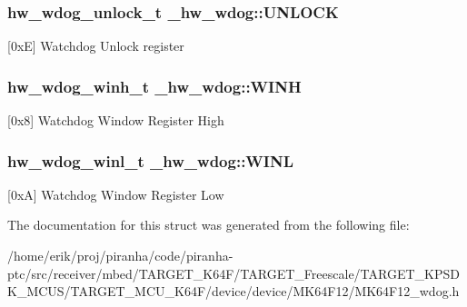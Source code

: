 \subsubsection[{\texorpdfstring{U\+N\+L\+O\+CK}{UNLOCK}}]{ {\bf hw\+\_\+wdog\+\_\+unlock\+\_\+t} \+\_\+hw\+\_\+wdog\+::\+U\+N\+L\+O\+CK}\hypertarget{struct__hw__wdog_a0a7523239c13256dca0cefa10aaf1ddf}{}\label{struct__hw__wdog_a0a7523239c13256dca0cefa10aaf1ddf}
\mbox{[}0xE\mbox{]} Watchdog Unlock register 
\subsubsection[{\texorpdfstring{W\+I\+NH}{WINH}}]{ {\bf hw\+\_\+wdog\+\_\+winh\+\_\+t} \+\_\+hw\+\_\+wdog\+::\+W\+I\+NH}\hypertarget{struct__hw__wdog_a2defae9e7cca4f46032b7bec7fa9f607}{}\label{struct__hw__wdog_a2defae9e7cca4f46032b7bec7fa9f607}
\mbox{[}0x8\mbox{]} Watchdog Window Register High 
\subsubsection[{\texorpdfstring{W\+I\+NL}{WINL}}]{ {\bf hw\+\_\+wdog\+\_\+winl\+\_\+t} \+\_\+hw\+\_\+wdog\+::\+W\+I\+NL}\hypertarget{struct__hw__wdog_ac5090ab8729dae9d452a8606b550b86b}{}\label{struct__hw__wdog_ac5090ab8729dae9d452a8606b550b86b}
\mbox{[}0xA\mbox{]} Watchdog Window Register Low 

The documentation for this struct was generated from the following file\+:\begin{DoxyCompactItemize}
\item 
/home/erik/proj/piranha/code/piranha-\/ptc/src/receiver/mbed/\+T\+A\+R\+G\+E\+T\+\_\+\+K64\+F/\+T\+A\+R\+G\+E\+T\+\_\+\+Freescale/\+T\+A\+R\+G\+E\+T\+\_\+\+K\+P\+S\+D\+K\+\_\+\+M\+C\+U\+S/\+T\+A\+R\+G\+E\+T\+\_\+\+M\+C\+U\+\_\+\+K64\+F/device/device/\+M\+K64\+F12/M\+K64\+F12\+\_\+wdog.\+h\end{DoxyCompactItemize}
